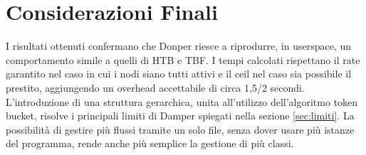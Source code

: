 \section{Considerazioni Finali}
I risultati ottenuti confermano che Donper riesce a riprodurre, in userspace, un comportamento simile a quelli di HTB e TBF. 
I tempi calcolati rispettano il rate garantito nel caso in cui i nodi siano tutti attivi e il ceil nel caso sia possibile il prestito, aggiungendo un overhead accettabile di circa 1,5/2 secondi. \\
\vspace*{0.01\textheight}
L'introduzione di una struttura gerarchica, unita all'utilizzo dell'algoritmo token bucket, risolve i principali limiti di Damper spiegati nella sezione \ref{sec:limiti}.
La possibilità di gestire più flussi tramite un solo file, senza dover usare più istanze del programma, rende anche più semplice la gestione di più classi.
